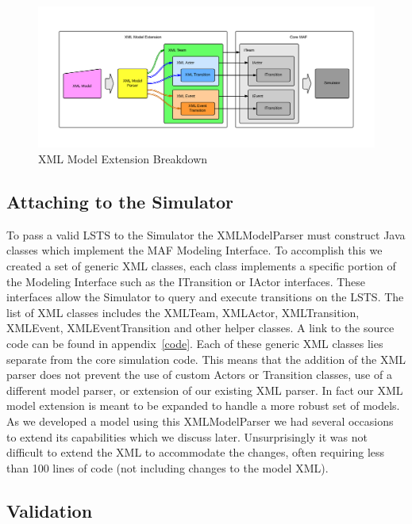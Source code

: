 \begin{figure}[h]
\begin{center}
\includegraphics[width=6in]{xml_model_extension.png}
\caption{XML Model Extension Breakdown}
\label{fig:xml_model_extension}
\end{center}
\end{figure}

\subsection{Attaching to the Simulator}

To pass a valid LSTS to the Simulator the XMLModelParser must construct Java classes which implement the MAF Modeling Interface.  To accomplish this we created a set of generic XML classes, each class implements a specific portion of the Modeling Interface such as the ITransition or IActor interfaces.  These interfaces allow the Simulator to query and execute transitions on the LSTS.  The list of XML classes includes the XMLTeam, XMLActor, XMLTransition, XMLEvent, XMLEventTransition and other helper classes.  A link to the source code can be found in appendix~\ref{code}.  Each of these generic XML classes lies separate from the core simulation code.  This means that the addition of the XML parser does not prevent the use of custom Actors or Transition classes, use of a different model parser, or extension of our existing XML parser.  In fact our XML model extension is meant to be expanded to handle a more robust set of models.   As we developed a model using this XMLModelParser we had several occasions to extend its capabilities which we discuss later.  Unsurprisingly it was not difficult to extend the XML to accommodate the changes, often requiring less than 100 lines of code (not including changes to the model XML).

\subsection{Validation}

